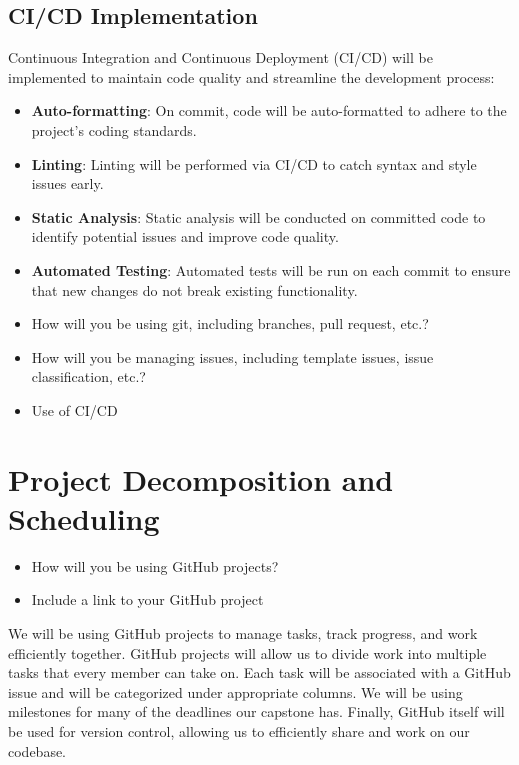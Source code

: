 \documentclass{article}
\begin{document}
\subsection{CI/CD Implementation}
Continuous Integration and Continuous Deployment (CI/CD) will be implemented to maintain code quality and streamline the development process:
\begin{itemize}
    \item \textbf{Auto-formatting}: On commit, code will be auto-formatted to adhere to the project's coding standards.
    \item \textbf{Linting}: Linting will be performed via CI/CD to catch syntax and style issues early.
    \item \textbf{Static Analysis}: Static analysis will be conducted on committed code to identify potential issues and improve code quality.
    \item \textbf{Automated Testing}: Automated tests will be run on each commit to ensure that new changes do not break existing functionality.
\end{itemize}

\begin{itemize}
	\item How will you be using git, including branches, pull request, etc.?
	\item How will you be managing issues, including template issues, issue
	classification, etc.?
  \item Use of CI/CD
\end{itemize}

\section{Project Decomposition and Scheduling}

\begin{itemize}
  \item How will you be using GitHub projects?
  \item Include a link to your GitHub project
\end{itemize}

We will be using GitHub projects to manage tasks, track progress, and work efficiently together. 
GitHub projects will allow us to divide work into multiple tasks that every member can take on. 
Each task will be associated with a GitHub issue and will be categorized under appropriate columns. 
We will be using milestones for many of the deadlines our capstone has. Finally, GitHub itself will 
be used for version control, allowing us to efficiently share and work on our codebase. \\
\end{document}
